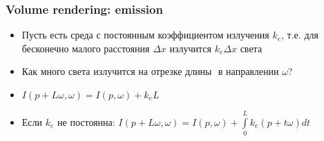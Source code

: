 \documentclass[10pt]{beamer}
\begin{document}
\begin{frame}[fragile]
\frametitle{Volume rendering: emission}
\begin{itemize}
\item Пусть есть среда с постоянным коэффициентом излучения \begin{math}k_e\end{math}, т.е. для бесконечно малого расстояния \begin{math}\Delta x\end{math} излучится \begin{math}k_e \Delta x\end{math} света
\pause
\item Как много света излучится на отрезке длины \begin{math}[p, p + L\omega]\end{math} в направлении \begin{math}\omega\end{math}?
\pause
\item \begin{math}I(p+L\omega,\omega) = I(p,\omega) + k_e L\end{math}
\pause
\item Если \begin{math}k_e\end{math} не постоянна: \begin{math}I(p+L\omega,\omega) = I(p,\omega) + \int\limits_0^L k_e(p+t\omega)dt\end{math}
\end{itemize}
\end{frame}
\end{document}
